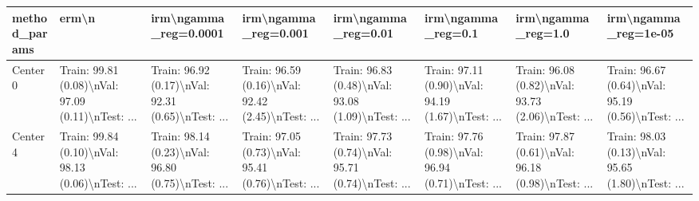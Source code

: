 \begin{tabular}{llllllll}
\toprule
method\_params &                                              erm\textbackslash n &                              irm\textbackslash ngamma\_reg=0.0001 &                               irm\textbackslash ngamma\_reg=0.001 &                                irm\textbackslash ngamma\_reg=0.01 &                                 irm\textbackslash ngamma\_reg=0.1 &                                 irm\textbackslash ngamma\_reg=1.0 &                               irm\textbackslash ngamma\_reg=1e-05 \\
\midrule
Center 0 &  Train: 99.81 (0.08)\textbackslash nVal: 97.09 (0.11)\textbackslash nTest: ... &  Train: 96.92 (0.17)\textbackslash nVal: 92.31 (0.65)\textbackslash nTest: ... &  Train: 96.59 (0.16)\textbackslash nVal: 92.42 (2.45)\textbackslash nTest: ... &  Train: 96.83 (0.48)\textbackslash nVal: 93.08 (1.09)\textbackslash nTest: ... &  Train: 97.11 (0.90)\textbackslash nVal: 94.19 (1.67)\textbackslash nTest: ... &  Train: 96.08 (0.82)\textbackslash nVal: 93.73 (2.06)\textbackslash nTest: ... &  Train: 96.67 (0.64)\textbackslash nVal: 95.19 (0.56)\textbackslash nTest: ... \\
Center 4 &  Train: 99.84 (0.10)\textbackslash nVal: 98.13 (0.06)\textbackslash nTest: ... &  Train: 98.14 (0.23)\textbackslash nVal: 96.80 (0.75)\textbackslash nTest: ... &  Train: 97.05 (0.73)\textbackslash nVal: 95.41 (0.76)\textbackslash nTest: ... &  Train: 97.73 (0.74)\textbackslash nVal: 95.71 (0.74)\textbackslash nTest: ... &  Train: 97.76 (0.98)\textbackslash nVal: 96.94 (0.71)\textbackslash nTest: ... &  Train: 97.87 (0.61)\textbackslash nVal: 96.18 (0.98)\textbackslash nTest: ... &  Train: 98.03 (0.13)\textbackslash nVal: 95.65 (1.80)\textbackslash nTest: ... \\
\bottomrule
\end{tabular}
